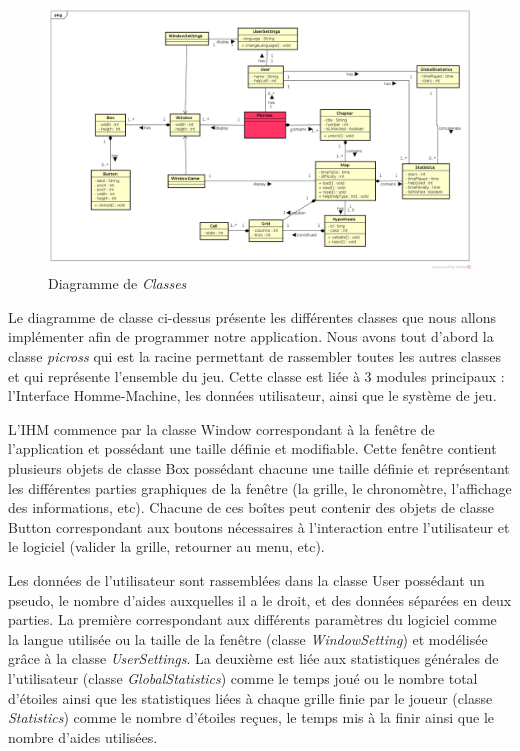 \documentclass{report}
\begin{document}
    \begin{figure}[H]
	\caption{Diagramme de \textit{Classes}}
	\includegraphics[width=17cm]{../UML/Class_diagram/DiagrammeClasse.png}
    \end{figure}
    
    	
	Le diagramme de classe ci-dessus présente les différentes classes que nous allons implémenter afin de programmer notre application. Nous avons tout d’abord la classe \textit{picross} qui est la racine permettant de rassembler toutes les autres classes et qui représente l’ensemble du jeu. Cette classe est liée à 3 modules principaux : l’Interface Homme-Machine, les données utilisateur, ainsi que le système de jeu.

	L’IHM commence par la classe Window correspondant à la fenêtre de l’application et possédant une taille définie et modifiable. Cette fenêtre contient plusieurs objets de classe Box possédant chacune une taille définie et représentant les différentes parties graphiques de la fenêtre (la grille, le chronomètre, l’affichage des informations, etc). Chacune de ces boîtes peut contenir des objets de classe Button correspondant aux boutons nécessaires à l’interaction entre l’utilisateur et le logiciel (valider la grille, retourner au menu, etc).

	Les données de l’utilisateur sont rassemblées dans la classe User possédant un pseudo, le nombre d’aides auxquelles il a le droit, et des données séparées en deux parties. La première correspondant aux différents paramètres du logiciel comme la langue utilisée ou la taille de la fenêtre (classe \textit{WindowSetting}) et modélisée grâce à la classe \textit{UserSettings}. La deuxième est liée aux statistiques  générales de l’utilisateur (classe \textit{GlobalStatistics}) comme le temps joué ou le nombre total d’étoiles ainsi que les statistiques liées à chaque grille finie par le joueur (classe \textit{Statistics}) comme le nombre d’étoiles reçues, le temps mis à la finir ainsi que le nombre d’aides utilisées.
\end{document}
